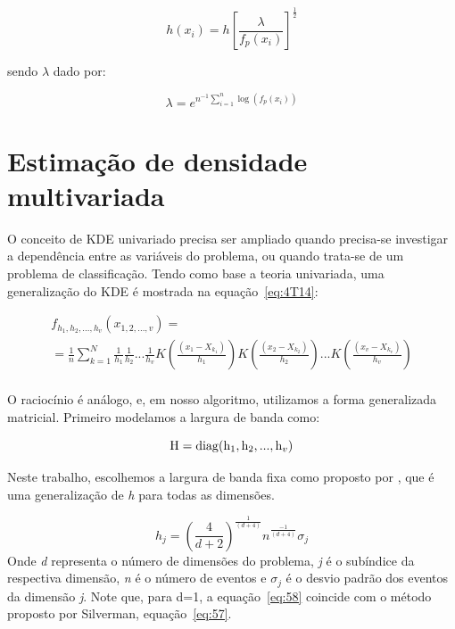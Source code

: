 \begin{equation}\label{eq:37}
  h\left( {{x_i}} \right) = h{\left[ {\frac{\lambda }{{{f_p}({x_i})}}} \right]^{\frac{1}{2}}}
\end{equation}

sendo ${\lambda}$ dado por:

\begin{equation}\label{eq:38}
  \lambda  = {e^{{n^{ - 1}}\mathop \sum \limits_{i = 1}^{n} \log ({f_p}({x_i}))}}
\end{equation}

\section{Estimação de densidade multivariada}\label{sec:kdemult}

O conceito de KDE univariado precisa ser ampliado quando precisa-se investigar a dependência entre as variáveis do problema, ou quando trata-se de um problema de classificação. Tendo como base a teoria univariada, uma generalização do KDE é mostrada na equação~\ref{eq:4T14}:

\begin{equation}\label{eq:4T14}
\begin{array}{l}
 {f_{{h_1},{h_2},...,{h_v}}}\left( {{x_{1,2,...,v}}} \right) =  \\
  = \frac{1}{n}\sum\limits_{k = 1}^N {\frac{1}{{{h_1}}}} \frac{1}{{{h_2}}}...\frac{1}{{{h_v}}}K\left( {\frac{{({x_1} - {X_{{k_1}}})}}{{{h_1}}}} \right)K\left( {\frac{{({x_2} - {X_{{k_2}}})}}{{{h_2}}}} \right)...K\left( {\frac{{({x_v} - {X_{{k_v}}})}}{{{h_v}}}} \right) \\
 \end{array}
\end{equation}

O raciocínio é análogo, e, em nosso algoritmo, utilizamos a forma generalizada matricial. Primeiro modelamos a largura de banda como:

\begin{equation}\label{eq:40}
{\rm{H = diag}}({{\rm{h}}_1},{{\rm{h}}_2},...,{{\rm{h}}_v})
\end{equation}

Neste trabalho, escolhemos a largura de banda fixa como proposto por  \cite{wand1995kernel}, que é uma generalização de \emph{h} para todas as dimensões.

\begin{equation}\label{eq:58}
    {h_j} = {\left( {\frac{4}{{d + 2}}} \right)^{\frac{1}{{(d + 4)}}}}{n^{\frac{{ - 1}}{{(d + 4)}}}}{\sigma _j}
\end{equation}
Onde \emph{d} representa o número de dimensões do problema, \emph{j} é o subíndice da respectiva dimensão, \emph{n} é o número de eventos  e ${\sigma _j}$ é o desvio padrão dos eventos da dimensão \emph{j}. Note que, para d=1, a equação~\ref{eq:58} coincide com o método proposto por Silverman, equação~\ref{eq:57}.

